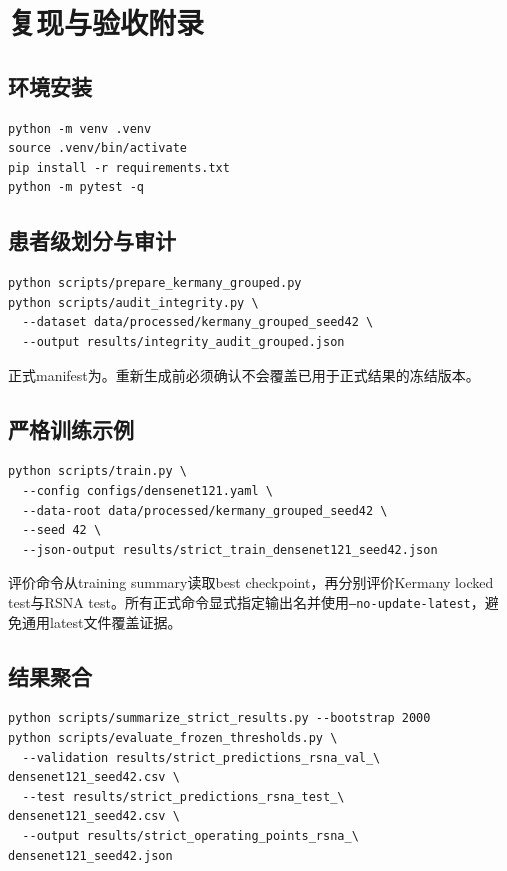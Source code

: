 \chapter{复现与验收附录}

\section{环境安装}
\begin{verbatim}
python -m venv .venv
source .venv/bin/activate
pip install -r requirements.txt
python -m pytest -q
\end{verbatim}

\section{患者级划分与审计}
\begin{verbatim}
python scripts/prepare_kermany_grouped.py
python scripts/audit_integrity.py \
  --dataset data/processed/kermany_grouped_seed42 \
  --output results/integrity_audit_grouped.json
\end{verbatim}

正式manifest为。重新生成前必须确认不会覆盖已用于正式结果的冻结版本。

\section{严格训练示例}
\begin{verbatim}
python scripts/train.py \
  --config configs/densenet121.yaml \
  --data-root data/processed/kermany_grouped_seed42 \
  --seed 42 \
  --json-output results/strict_train_densenet121_seed42.json
\end{verbatim}

评价命令从training summary读取best checkpoint，再分别评价Kermany locked test与RSNA test。所有正式命令显式指定输出名并使用\texttt{--no-update-latest}，避免通用latest文件覆盖证据。

\section{结果聚合}
\small\begin{verbatim}
python scripts/summarize_strict_results.py --bootstrap 2000
python scripts/evaluate_frozen_thresholds.py \
  --validation results/strict_predictions_rsna_val_\
densenet121_seed42.csv \
  --test results/strict_predictions_rsna_test_\
densenet121_seed42.csv \
  --output results/strict_operating_points_rsna_\
densenet121_seed42.json
\end{verbatim}
\normalsize

